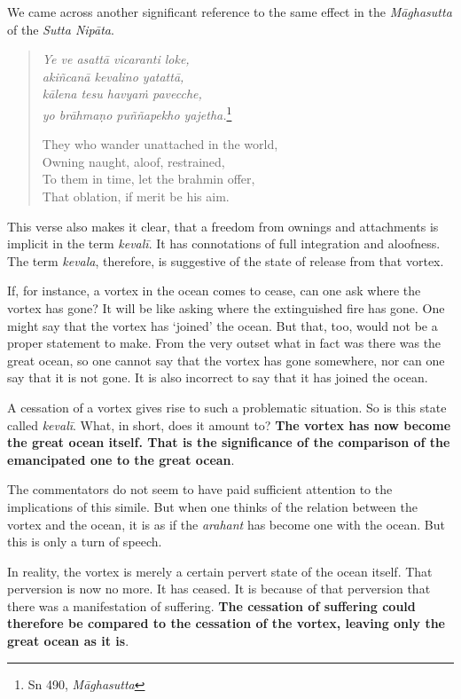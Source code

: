 We came across another significant reference to the same effect in the \emph{Māghasutta} of the \emph{Sutta Nipāta}.

\begin{quote}
\emph{Ye ve asattā vicaranti loke,}\\
\emph{akiñcanā kevalino yatattā,}\\
\emph{kālena tesu havyaṁ pavecche,}\\
\emph{yo brāhmaṇo puññapekho yajetha.}\footnote{Sn 490, \emph{Māghasutta}}

They who wander unattached in the world,\\
Owning naught, aloof, restrained,\\
To them in time, let the brahmin offer,\\
That oblation, if merit be his aim.
\end{quote}

This verse also makes it clear, that a freedom from ownings and attachments is implicit in the term \emph{kevalī}. It has connotations of full integration and aloofness. The term \emph{kevala}, therefore, is suggestive of the state of release from that vortex.

If, for instance, a vortex in the ocean comes to cease, can one ask where the vortex has gone? It will be like asking where the extinguished fire has gone. One might say that the vortex has `joined' the ocean. But that, too, would not be a proper statement to make. From the very outset what in fact was there was the great ocean, so one cannot say that the vortex has gone somewhere, nor can one say that it is not gone. It is also incorrect to say that it has joined the ocean.

A cessation of a vortex gives rise to such a problematic situation. So is this state called \emph{kevalī}. What, in short, does it amount to? \textbf{The vortex has now become the great ocean itself. That is the significance of the comparison of the emancipated one to the great ocean}.

The commentators do not seem to have paid sufficient attention to the implications of this simile. But when one thinks of the relation between the vortex and the ocean, it is as if the \emph{arahant} has become one with the ocean. But this is only a turn of speech.

In reality, the vortex is merely a certain pervert state of the ocean itself. That perversion is now no more. It has ceased. It is because of that perversion that there was a manifestation of suffering. \textbf{The cessation of suffering could therefore be compared to the cessation of the vortex, leaving only the great ocean as it is}.

